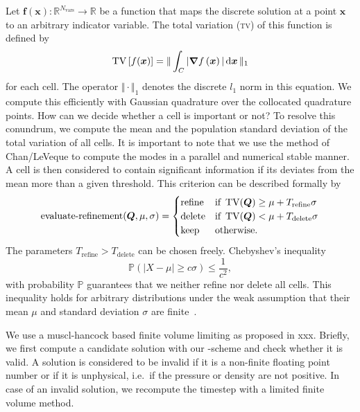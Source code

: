 \documentclass[runningheads]{llncs}
\begin{document}
Let $\bm{f}(\bm{x}): \mathbb{R}^{N_\text{vars}} \to \mathbb{R}$ be a function that maps the discrete solution at a point $\bm{x}$ to an arbitrary indicator variable.
The total variation (\textsc{tv}) of this function is defined by
\begin{equation}
  \label{eq:tv}
  \tv \left[ f(\bm{x}) \right] =
  \Vert
\intdcell{ \vert \gradient{f \left( \bm{x} \right)} \vert }
\Vert_1
\end{equation}
for each cell.
The operator $\Vert \cdot \Vert_1$ denotes the discrete $l_1$ norm in this equation.
We compute this efficiently with Gaussian quadrature over the collocated quadrature points.
\newcommand{\mean}{\mu}%
\newcommand{\std}{\sigma}%
\newcommand{\variance}{\std^2}%
\newcommand{\Trefine}{T_\text{refine}}%
\newcommand{\Tdelete}{T_\text{delete}}%
How can we decide whether a cell is important or not?
To resolve this conundrum, we compute the mean and the population standard deviation of the total variation of all cells.
It is important to note that we use the method of Chan/LeVeque to compute the modes in a parallel and numerical stable manner.
A cell is then considered to contain significant information if its deviates from the mean more than a given threshold.
This criterion can be described formally by
\begin{equation}
  \label{eq:refinement-criterion}
  \operatorname{evaluate-refinement}(\Q, \mu, \sigma) =
  \begin{cases}
    \text{refine} & \text{if } \tv(\Q) \geq \mu + \Trefine \sigma \\
    \text{delete} & \text{if } \tv(\Q) < \mu + \Tdelete \sigma \\
    \text{keep} & \text{otherwise}.
    \end{cases}
\end{equation}
The parameters $\Trefine > \Tdelete$ can be chosen freely.
Chebyshev's inequality
\begin{equation}
  \label{eq:chebychev}
  \mathbb{P}(\vert X - \mu \vert \geq c \sigma) \leq \frac{1}{c^2},
\end{equation}
with probability $\mathbb{P}$ guarantees that we neither refine nor delete all cells.
This inequality holds for arbitrary distributions under the weak assumption that their mean $\mu$ and standard deviation $\sigma$ are finite~\cite{wasserman2004all}.

We use a muscl-hancock based finite volume limiting as proposed in xxx.
Briefly, we first compute a candidate solution with our \aderdg{}-scheme and check whether it is valid.
A solution is considered to be invalid if it is a non-finite floating point number or if it is unphysical, i.e.\ if the pressure or density are not positive.
In case of an invalid solution, we recompute the timestep with a limited \muscl{} finite volume method.
\end{document}
